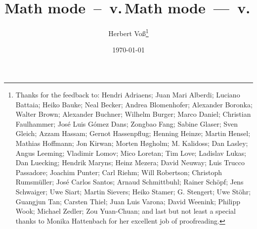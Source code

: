   \ifpdf\title{Math mode~--~v.\,\MathmodeVersion}\else
    \title{\logo Math mode~---~v.\,\MathmodeVersion}\fi%
%
\author{Herbert Vo\ss\footnote{\sloppy Thanks for the feedback to:
  Hendri Adriaens; Juan Mari Alberdi;
  Luciano Battaia;
  Heiko Bauke; Neal Becker; Andrea Blomenhofer; Alexander Boronka; Walter Brown; 
  Alexander Buchner; Wilhelm Burger;
  Marco Daniel;
  Christian Faulhammer; Jos\'e{} Luis G\'omez Dans;
  Zongbao Fang;
  Sabine Glaser; Sven Gleich; 
  Azzam Hassam; Gernot Hassenpflug; Henning Heinze; Martin Hensel; Mathias Hoffmann; 
  Jon Kirwan; 
  Morten H\o{}gholm; M. Kalidoss; Dan Lasley; 
  Angus Leeming; Vladimir Lomov; Mico Loretan; Tim Love; Ladislav Lukas; Dan Luecking;
  Hendrik Maryns; Heinz Mezera;
  David Neuway;
  Luis Trucco Passadore; Joachim Punter;
  Carl Riehm; Will Robertson; Christoph Rumsm\"uller;
  Jos\'e{} Carlos Santos;  Arnaud Schmittbuhl;
    Rainer Sch\"opf; Jens Schwaiger; Uwe Siart; Martin Sievers; Heiko Stamer; 
    G. Stengert; Uwe St\"ohr;
  Guangjun Tan;
  Carsten Thiel; 
  Juan Luis Varona;
  David Weenink;
  Philipp Wook;
  Michael Zedler;
  Zou Yuan-Chuan;
  and last but not least a special thanks to Monika Hattenbach for her 
  excellent job of proofreading.
}}
\date{\today}

\maketitle

